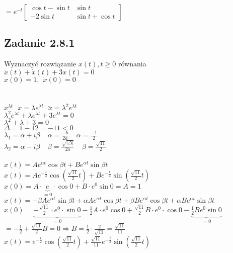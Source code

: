 $=e^{-t}\left[\begin{array}{cc}\cos t - \sin t & \sin t \\-2\sin t &\sin t +\cos t\end{array}\right]$\\


\pagebreak
\subsection*{Zadanie 2.8.1} {\color{darkgray}
	Wyznaczyć rozwiązanie $x(t), t\geqslant 0$ równania\\
	$\ddot{x}(t)+\dot{x}(t)+3x(t)=0$\\
	$x(0)=1, \ \ \dot{x}(0)=0$\\
}\lineh
\\\\
$x^{\lambda t} \ \ \ \dot{x}=\lambda e^{\lambda t} \ \ \ \ddot{x}=\lambda^2 e^{\lambda t}$\\
$\lambda^2e^{\lambda t}+\lambda e^{\lambda t}+3e^{\lambda t}=0$\\
$\lambda^2+\lambda+3=0$\\
$\Delta=1-12=-11<0$\\
$\lambda_1=\alpha+i\beta \ \ \ \ \ \alpha=\frac{-b}{2a} \ \ \ \ \ \alpha=\frac{-1}{2}$\\
$\lambda_2=\alpha-i\beta \ \ \ \ \ \beta=\frac{\sqrt{|\Delta|}}{2a} \ \ \ \ \ \beta=\frac{\sqrt{11}}{2}$\\
\\
$x(t)=Ae^{\alpha t}\cos \beta t+Be^{\alpha t}\sin \beta t$\\
$x(t)=Ae^{-\frac{t}{2}}\cos(\frac{\sqrt{11}}{2}t)+Be^{-\frac t2}\sin(\frac{\sqrt{11}}{2}t)$\\
$x(0)=A\cdot \underbrace{e}_{=0}\cdot \cos 0+B\cdot e^0\sin 0=\boxed{A=1}$\\
$\dot{x}(t)=-\beta Ae^{\alpha t}\sin \beta t+\alpha A e^{\alpha t}\cos \beta t+\beta Be^{\alpha t}\cos\beta t+\alpha B e^{\alpha t}\sin \beta t$\\
$\dot{x}(0)=\underbrace{-\frac{\sqrt{11}}{2}\cdot e^0\cdot\sin 0}_{=0}-\frac12A\cdot e^0\cos 0+\frac{\sqrt{11}}{2}B\cdot e^0\cdot\cos 0 -\underbrace{\frac12Be^0\sin0}_{=0}=$\\
$=-\frac12+\frac{\sqrt{11}}{2}B=0\Rightarrow\boxed{B=\frac12\cdot\frac{2}{\sqrt{11}}=\frac{\sqrt{11}}{11}}$\\
$\boxed{x(t)=e^{-\frac t2}\cos(\frac{\sqrt{11}}{2}t)+\frac{\sqrt{11}}{11}e^{-\frac t2}\sin(\frac{\sqrt{11}}{2}t)}$\\


